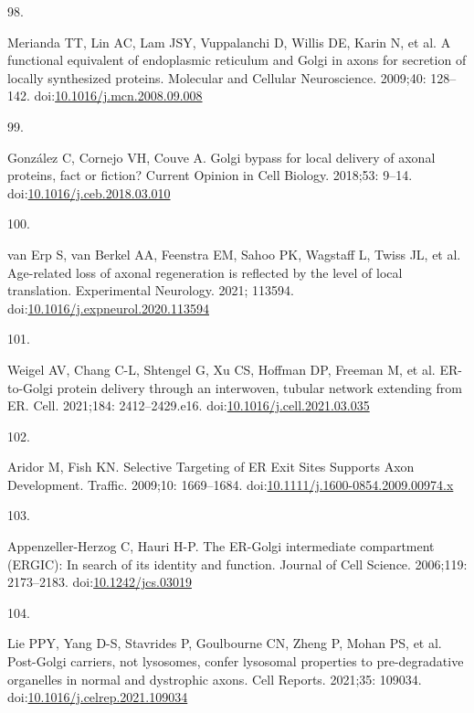 \documentclass[
  12pt,
  a4paper,
]{book}
\newlength{\cslhangindent}
\newlength{\csllabelwidth}
\newlength{\cslentryspacingunit} %
\newenvironment{CSLReferences}[2] %
 {%
  \setlength{\parindent}{0pt}
  \ifodd #1
  \let\oldpar\par
  \def\par{\hangindent=\cslhangindent\oldpar}
  \fi
  \setlength{\parskip}{#2\cslentryspacingunit}
 }%
 {}
\newcommand{\CSLLeftMargin}[1]{\parbox[t]{\csllabelwidth}{#1}}
\newcommand{\CSLRightInline}[1]{\parbox[t]{\linewidth - \csllabelwidth}{#1}\break}
\begin{document}
\begin{CSLReferences}{0}{0}
\leavevmode{}%
\CSLLeftMargin{98. }%
\CSLRightInline{Merianda TT, Lin AC, Lam JSY, Vuppalanchi D, Willis DE, Karin N, et al. A functional equivalent of endoplasmic reticulum and {Golgi} in axons for secretion of locally synthesized proteins. Molecular and Cellular Neuroscience. 2009;40: 128--142. doi:\href{https://doi.org/10.1016/j.mcn.2008.09.008}{10.1016/j.mcn.2008.09.008}}

\leavevmode{}%
\CSLLeftMargin{99. }%
\CSLRightInline{González C, Cornejo VH, Couve A. Golgi bypass for local delivery of axonal proteins, fact or fiction? Current Opinion in Cell Biology. 2018;53: 9--14. doi:\href{https://doi.org/10.1016/j.ceb.2018.03.010}{10.1016/j.ceb.2018.03.010}}

\leavevmode{}%
\CSLLeftMargin{100. }%
\CSLRightInline{van Erp S, van Berkel AA, Feenstra EM, Sahoo PK, Wagstaff L, Twiss JL, et al. Age-related loss of axonal regeneration is reflected by the level of local translation. Experimental Neurology. 2021; 113594. doi:\href{https://doi.org/10.1016/j.expneurol.2020.113594}{10.1016/j.expneurol.2020.113594}}

\leavevmode{}%
\CSLLeftMargin{101. }%
\CSLRightInline{Weigel AV, Chang C-L, Shtengel G, Xu CS, Hoffman DP, Freeman M, et al. {ER-to-Golgi} protein delivery through an interwoven, tubular network extending from {ER}. Cell. 2021;184: 2412--2429.e16. doi:\href{https://doi.org/10.1016/j.cell.2021.03.035}{10.1016/j.cell.2021.03.035}}

\leavevmode{}%
\CSLLeftMargin{102. }%
\CSLRightInline{Aridor M, Fish KN. Selective {Targeting} of {ER Exit Sites Supports Axon Development}. Traffic. 2009;10: 1669--1684. doi:\href{https://doi.org/10.1111/j.1600-0854.2009.00974.x}{10.1111/j.1600-0854.2009.00974.x}}

\leavevmode{}%
\CSLLeftMargin{103. }%
\CSLRightInline{Appenzeller-Herzog C, Hauri H-P. The {ER-Golgi} intermediate compartment ({ERGIC}): In search of its identity and function. Journal of Cell Science. 2006;119: 2173--2183. doi:\href{https://doi.org/10.1242/jcs.03019}{10.1242/jcs.03019}}

\leavevmode{}%
\CSLLeftMargin{104. }%
\CSLRightInline{Lie PPY, Yang D-S, Stavrides P, Goulbourne CN, Zheng P, Mohan PS, et al. Post-{Golgi} carriers, not lysosomes, confer lysosomal properties to pre-degradative organelles in normal and dystrophic axons. Cell Reports. 2021;35: 109034. doi:\href{https://doi.org/10.1016/j.celrep.2021.109034}{10.1016/j.celrep.2021.109034}}


\end{CSLReferences}
\end{document}

